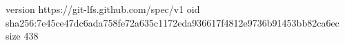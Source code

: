 version https://git-lfs.github.com/spec/v1
oid sha256:7e45ce47dc6ada758fe72a635c1172eda936617f4812e9736b91453bb82ca6ec
size 438
